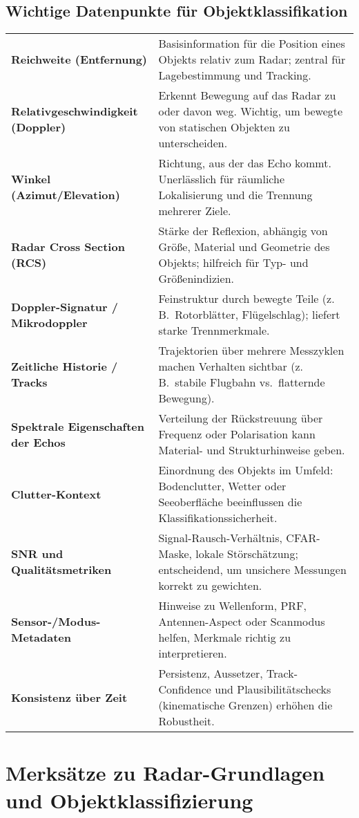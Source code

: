 \subsection{Wichtige Datenpunkte für Objektklassifikation}
\begin{tabular}{p{} p{}}
\textbf{Reichweite (Entfernung)} & Basisinformation für die Position eines Objekts relativ zum Radar; zentral für Lagebestimmung und Tracking. \\[0.5em]
\textbf{Relativgeschwindigkeit (Doppler)} & Erkennt Bewegung auf das Radar zu oder davon weg. Wichtig, um bewegte von statischen Objekten zu unterscheiden. \\[0.5em]
\textbf{Winkel (Azimut/Elevation)} & Richtung, aus der das Echo kommt. Unerlässlich für räumliche Lokalisierung und die Trennung mehrerer Ziele. \\[0.5em]
\textbf{Radar Cross Section (RCS)} & Stärke der Reflexion, abhängig von Größe, Material und Geometrie des Objekts; hilfreich für Typ- und Größenindizien. \\[0.5em]
\textbf{Doppler-Signatur / Mikrodoppler} & Feinstruktur durch bewegte Teile (z.\,B.\ Rotorblätter, Flügelschlag); liefert starke Trennmerkmale. \\[0.5em]
\textbf{Zeitliche Historie / Tracks} & Trajektorien über mehrere Messzyklen machen Verhalten sichtbar (z.\,B.\ stabile Flugbahn vs.\ flatternde Bewegung). \\[0.5em]
\textbf{Spektrale Eigenschaften der Echos} & Verteilung der Rückstreuung über Frequenz oder Polarisation kann Material- und Strukturhinweise geben. \\[0.5em]
\textbf{Clutter-Kontext} & Einordnung des Objekts im Umfeld: Bodenclutter, Wetter oder Seeoberfläche beeinflussen die Klassifikationssicherheit. \\[0.5em]
\textbf{SNR und Qualitätsmetriken} & Signal-Rausch-Verhältnis, CFAR-Maske, lokale Störschätzung; entscheidend, um unsichere Messungen korrekt zu gewichten. \\[0.5em]
\textbf{Sensor-/Modus-Metadaten} & Hinweise zu Wellenform, PRF, Antennen-Aspect oder Scanmodus helfen, Merkmale richtig zu interpretieren. \\[0.5em]
\textbf{Konsistenz über Zeit} & Persistenz, Aussetzer, Track-Confidence und Plausibilitätschecks (kinematische Grenzen) erhöhen die Robustheit. \\
\end{tabular}

\section{Merksätze zu Radar-Grundlagen und Objektklassifizierung}

